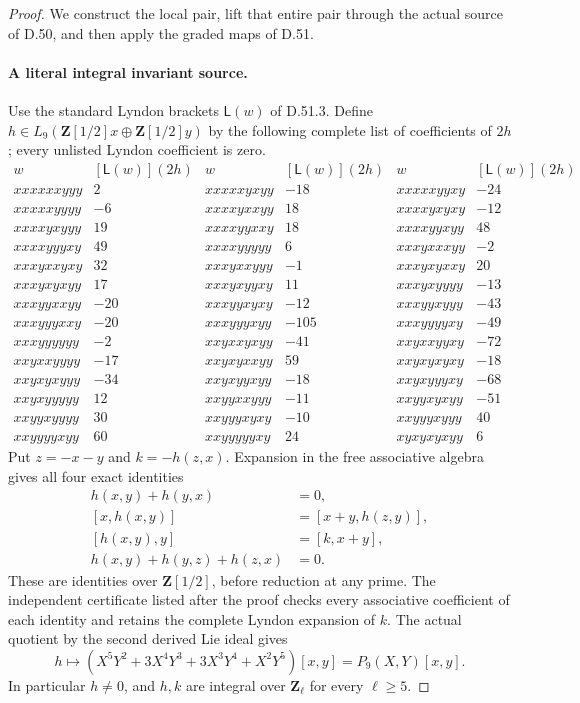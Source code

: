 \begin{proof}
We construct the local pair, lift that entire pair through the actual
source of D.50, and then apply the graded maps of D.51.

\paragraph{A literal integral invariant source.}
Use the standard Lyndon brackets \(\mathsf L(w)\) of D.51.3.
Define \(h\in L_9(\mathbf Z[1/2]x\oplus\mathbf Z[1/2]y)\)
by the following complete list of coefficients of \(2h\);
every unlisted Lyndon coefficient is zero.
\[
\begin{array}{lr|lr|lr}
 w&[\mathsf L(w)](2h)&w&[\mathsf L(w)](2h)&w&[\mathsf L(w)](2h)\\\hline
 xxxxxxyyy&2&xxxxxyxyy&-18&xxxxxyyxy&-24\\
 xxxxxyyyy&-6&xxxxyxxyy&18&xxxxyxyxy&-12\\
 xxxxyxyyy&19&xxxxyyxxy&18&xxxxyyxyy&48\\
 xxxxyyyxy&49&xxxxyyyyy&6&xxxyxxxyy&-2\\
 xxxyxxyxy&32&xxxyxxyyy&-1&xxxyxyxxy&20\\
 xxxyxyxyy&17&xxxyxyyxy&11&xxxyxyyyy&-13\\
 xxxyyxxyy&-20&xxxyyxyxy&-12&xxxyyxyyy&-43\\
 xxxyyyxxy&-20&xxxyyyxyy&-105&xxxyyyyxy&-49\\
 xxxyyyyyy&-2&xxyxxyxyy&-41&xxyxxyyxy&-72\\
 xxyxxyyyy&-17&xxyxyxxyy&59&xxyxyxyxy&-18\\
 xxyxyxyyy&-34&xxyxyyxyy&-18&xxyxyyyxy&-68\\
 xxyxyyyyy&12&xxyyxxyyy&-11&xxyyxyxyy&-51\\
 xxyyxyyyy&30&xxyyyxyxy&-10&xxyyyxyyy&40\\
 xxyyyyxyy&60&xxyyyyyxy&24&xyxyxyxyy&6
\end{array}
\tag{D.52.3}
\]
Put \(z=-x-y\) and \(k=-h(z,x)\). Expansion in the free
associative algebra gives all four exact identities
\[
 \begin{aligned}
 h(x,y)+h(y,x)&=0,\\
 [x,h(x,y)]&=[x+y,h(z,y)],\\
 [h(x,y),y]&=[k,x+y],\\
 h(x,y)+h(y,z)+h(z,x)&=0.
 \end{aligned}
 \tag{D.52.4}
\]
These are identities over \(\mathbf Z[1/2]\), before reduction
at any prime. The independent certificate listed after the proof
checks every associative coefficient of each identity and retains
the complete Lyndon expansion of \(k\).
The actual quotient by the second derived Lie ideal gives
\[
 h\longmapsto
  (X^5Y^2+3X^4Y^3+3X^3Y^4+X^2Y^5)[x,y]
               =P_9(X,Y)[x,y].
 \tag{D.52.5}
\]
In particular \(h\ne0\), and \(h,k\) are integral over
\(\mathbf Z_\ell\) for every \(\ell\geq5\).


\end{proof}
